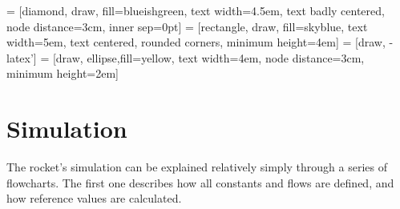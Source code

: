  = [diamond, draw, fill=blueishgreen,
    text width=4.5em, text badly centered, node distance=3cm, inner sep=0pt]
 = [rectangle, draw, fill=skyblue,
    text width=5em, text centered, rounded corners, minimum height=4em]
 = [draw, -latex']
 = [draw, ellipse,fill=yellow, text width=4em, node distance=3cm,
    minimum height=2em]



\chapter{Simulation}

The rocket's simulation can be explained relatively simply through a series of flowcharts. The first one describes how all constants and flows are defined, and how reference values are calculated.

